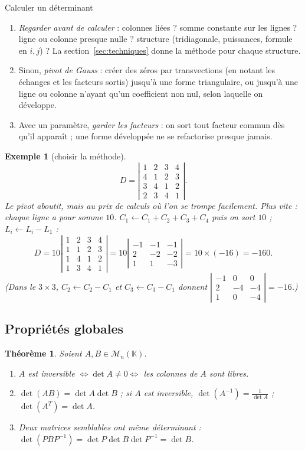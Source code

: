 \documentclass[a4paper,11pt]{article}
\numberwithin{equation}{section}
\numberwithin{figure}{section}
\numberwithin{table}{section}
\theoremstyle{enonce}
\newtheorem{theoreme}[definition]{Théorème}
\theoremstyle{exemple}
\newtheorem{exemple}[definition]{Exemple}
\theoremstyle{remarque}
\newcommand{\K}{\mathbb{K}}
\newcommand{\Mn}[1]{\mathcal{M}_{n}(#1)}
\newcommand{\dt}[1]{\left|\begin{matrix}#1\end{matrix}\right|}
\begin{document}
\begin{methode}{Calculer un déterminant}\label{meth:calcul}
\begin{enumerate}
\item \emph{Regarder avant de calculer} : colonnes liées ? somme constante sur les lignes ? ligne ou colonne presque nulle ?
      structure (tridiagonale, puissances, formule en $i,j$) ? La section~\ref{sec:techniques} donne la méthode pour chaque
      structure.
\item Sinon, \emph{pivot de Gauss} : créer des zéros par transvections (en notant les échanges et les facteurs sortis)
      jusqu'à une forme triangulaire, ou jusqu'à une ligne ou colonne n'ayant qu'un coefficient non nul, selon laquelle on
      développe.
\item Avec un paramètre, \emph{garder les facteurs} : on sort tout facteur commun dès qu'il apparaît ; une forme développée
      ne se refactorise presque jamais.
\end{enumerate}
\end{methode}

\begin{exemple}[choisir la méthode]
\[D=\dt{1&2&3&4\\4&1&2&3\\3&4&1&2\\2&3&4&1}.\]
Le pivot aboutit, mais au prix de calculs où l'on se trompe facilement. Plus vite : chaque ligne a pour somme $10$. $C_1\leftarrow C_1+C_2+C_3+C_4$ puis on sort $10$ ; $L_i\leftarrow L_i-L_1$ :
\[D=10\dt{1&2&3&4\\1&1&2&3\\1&4&1&2\\1&3&4&1}=10\dt{-1&-1&-1\\2&-2&-2\\1&1&-3}=10\times(-16)=-160.\]
(Dans le $3\times3$, $C_2\leftarrow C_2-C_1$ et $C_3\leftarrow C_3-C_1$ donnent $\dt{-1&0&0\\2&-4&-4\\1&0&-4}=-16$.)
\end{exemple}

\subsection{Propriétés globales}

\begin{theoreme}\label{thm:fond}
Soient $A,B\in\Mn{\K}$.
\begin{enumerate}
\item $A$ est inversible $\iff\det A\neq0\iff$ les colonnes de $A$ sont libres.
\item $\det(AB)=\det A\det B$ ; si $A$ est inversible, $\det(A^{-1})=\frac1{\det A}$ ; $\det(A^T)=\det A$.
\item Deux matrices semblables ont même déterminant : $\det(PBP^{-1})=\det P\det B\det P^{-1}=\det B$.
\end{enumerate}
\end{theoreme}
\end{document}
